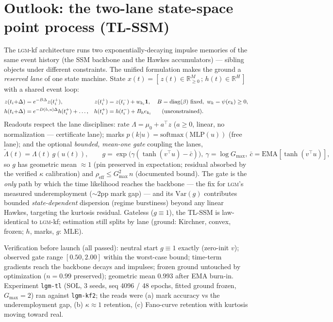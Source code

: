 \documentclass[11pt]{article}
\newcommand{\lgm}{\textsc{lgm}}
\begin{document}
\section{Outlook: the two-lane state-space point process (TL-SSM)}
\label{sec:tlssm}

The \lgm{}-kf architecture runs two exponentially-decaying impulse memories of the
same event history (the SSM backbone and the Hawkes accumulators) --- sibling
objects under different constraints. The unified formulation makes the ground a
\emph{reserved lane} of one state machine. State $x(t) = [\,z(t) \in
\mathbb{R}^M_{\ge0}\,;\, h(t) \in \mathbb{R}^H\,]$ with a shared event loop:
\begin{align}
z(t_i{+}\Delta) &= e^{-B\Delta} z(t_i^+), & z(t_i^+) &= z(t_i^-) + w_{k_i}\mathbf{1},
& B &= \mathrm{diag}(\beta)\ \text{fixed},\ w_k = \psi(e_k)\ge0, \notag\\
h(t_i{+}\Delta) &= e^{-D(h,u)\Delta}h(t_i^+) + \ldots, & h(t_i^+) &= h(t_i^-) + B_h e_{k_i}
& &\text{(unconstrained)}. \notag
\end{align}
Readouts respect the lane disciplines: rate $\Lambda = \mu_0 + a^\top z$ ($a\ge0$,
linear, no normalization --- certificate lane); marks
$p(k|u)=\mathrm{softmax}(\mathrm{MLP}(u))$ (free lane); and the optional
\emph{bounded, mean-one gate} coupling the lanes,
\begin{equation}
\tilde\Lambda(t) = \Lambda(t)\,g(u(t)),\qquad
g = \exp\big(\gamma(\tanh(v^\top u) - \bar c)\big),\ \gamma=\log G_{\max},\
\bar c = \mathrm{EMA}[\tanh(v^\top u)],
\end{equation}
so $g$ has geometric mean ${\approx}1$ (pin preserved in expectation; residual
absorbed by the verified $\kappa$ calibration) and $\rho_{\text{eff}} \le
G_{\max}^2\, n$ (documented bound). The gate is the \emph{only} path by which the
time likelihood reaches the backbone --- the fix for \lgm{}'s measured
underemployment (${\sim}2$pp mark gap) --- and its $\mathrm{Var}(g)$ contributes
bounded \emph{state-dependent} dispersion (regime burstiness) beyond any linear
Hawkes, targeting the kurtosis residual. Gateless ($g{\equiv}1$), the TL-SSM is
law-identical to \lgm{}-kf; estimation still splits by lane (ground: Kirchner,
convex, frozen; $h$, marks, $g$: MLE).

Verification before launch (all passed): neutral start $g\equiv1$ exactly
(zero-init $v$); observed gate range $[0.50, 2.00]$ within the worst-case bound;
time-term gradients reach the backbone decays and impulses; frozen ground
untouched by optimization ($n=0.99$ preserved); geometric mean $0.993$ after EMA
burn-in. Experiment \texttt{lgm-tl} (SOL, 3 seeds, seq 4096 / 48 epochs, fitted
ground frozen, $G_{\max}=2$) ran against \texttt{lgm-kf2}; the reads were
(a) mark accuracy vs the underemployment gap, (b) $\kappa \approx 1$ retention,
(c) Fano-curve retention with kurtosis moving toward real.
\end{document}
